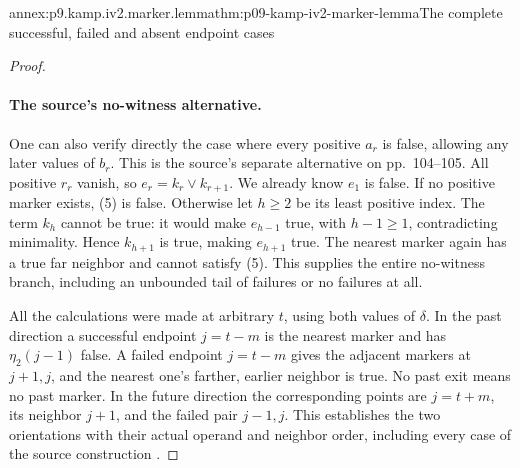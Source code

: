 \begin{annexitem}{annex:p9.kamp.iv2.marker.lemma}{thm:p09-kamp-iv2-marker-lemma}{The complete successful, failed and absent endpoint cases}
\begin{proof}
\paragraph{The source's no-witness alternative.}
One can also verify directly the case where every positive
\(a_r\) is false, allowing any later values of \(b_r\).
This is the source's separate alternative on pp.~104--105.
All positive \(r_r\) vanish, so
\(e_r=k_r\lor k_{r+1}\). We already know \(e_1\)
is false. If no positive marker exists, (5) is false.
Otherwise let \(h\geq2\) be its least positive index.
The term \(k_h\) cannot be true: it would make
\(e_{h-1}\) true, with \(h-1\geq1\), contradicting
minimality. Hence \(k_{h+1}\) is true, making
\(e_{h+1}\) true. The nearest marker again has a
true far neighbor and cannot satisfy (5). This supplies
the entire no-witness branch, including an unbounded tail
of failures or no failures at all.

All the calculations were made at arbitrary \(t\), using
both values of \(\delta\). In the past direction a
successful endpoint \(j=t-m\) is the nearest marker
and has \(\eta_2(j-1)\) false. A failed endpoint
\(j=t-m\) gives the adjacent markers at \(j+1,j\),
and the nearest one's farther, earlier neighbor is true.
No past exit means no past marker. In the future direction
the corresponding points are \(j=t+m\), its neighbor
\(j+1\), and the failed pair \(j-1,j\). This
establishes the two orientations with their actual operand
and neighbor order, including every case of the source
construction
\cite[ch.~IV, thm.~2 proof, pp.~101--105]{Kamp1968}.
\end{proof}
\end{annexitem}


